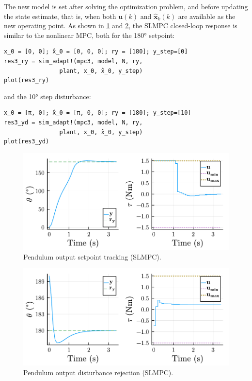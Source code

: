 The new model is set after solving the optimization problem, and before updating the state estimate, that is, when both $\mathbf{u}(k)$ and $\mathbf{\hat{x}}_k(k)$ are available as the new operating point. As shown in \cref{fig:plot_SuccLinMPC1} and \ref{fig:plot_SuccLinMPC2}, the SLMPC closed-loop response is similar to the nonlinear MPC, both for the 180° setpoint:
\begin{verbatim}
x_0 = [0, 0]; x̂_0 = [0, 0, 0]; ry = [180]; y_step=[0]
res3_ry = sim_adapt!(mpc3, model, N, ry, 
                plant, x_0, x̂_0, y_step)
plot(res3_ry)
\end{verbatim}
and the 10° step disturbance:
\begin{verbatim}
x_0 = [π, 0]; x̂_0 = [π, 0, 0]; ry = [180]; y_step=[10]
res3_yd = sim_adapt!(mpc3, model, N, ry, 
                plant, x_0, x̂_0, y_step)
plot(res3_yd)
\end{verbatim}

\begin{figure}[ht]
    \centering
    \includegraphics[width=\columnwidth]{fig/plot_SuccLinMPC1.pdf}
    \caption{Pendulum output setpoint tracking (SLMPC).}\label{fig:plot_SuccLinMPC1}
\end{figure}

\begin{figure}[ht]
    \centering
    \includegraphics[width=\columnwidth]{fig/plot_SuccLinMPC2.pdf}
    \caption{Pendulum output disturbance rejection (SLMPC).}\label{fig:plot_SuccLinMPC2}
\end{figure}

